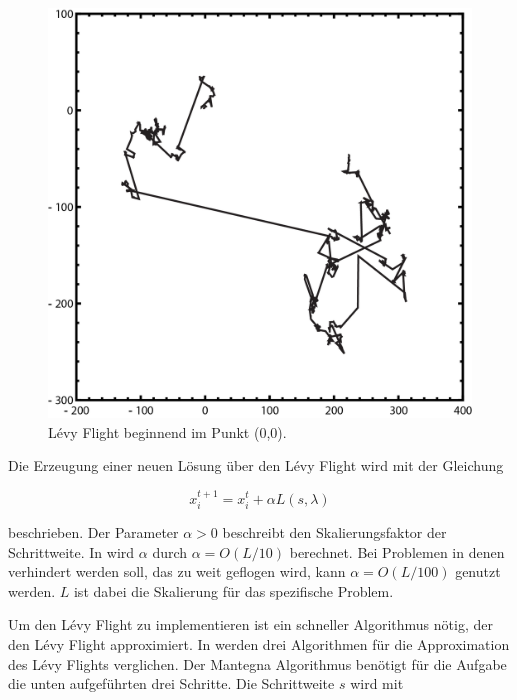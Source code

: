 \documentclass[conference]{IEEEtran}
\begin{document}
      \begin{figure}
        \centering
        \includegraphics[width=1\linewidth]{LevyFlight.png}
        \caption{Lévy Flight beginnend im Punkt (0,0).}
        \label{fig:levyFlight}
      \end{figure}


      Die Erzeugung einer neuen Lösung über den Lévy Flight wird mit der Gleichung

      \begin{equation}
      x_{i}^{t+1} = x_{i}^{t} + \alpha L(s, \lambda)\label{eq}
      \end{equation}

      beschrieben. Der Parameter $\alpha > 0$ beschreibt den Skalierungsfaktor der Schrittweite.  
      In \cite{b7} wird $\alpha$ durch $\alpha = O(L/10)$ berechnet. Bei Problemen in denen verhindert 
      werden soll, das zu weit geflogen wird, kann $\alpha = O(L/100)$ genutzt werden. $L$ ist dabei die 
      Skalierung für das spezifische Problem.

      Um den Lévy Flight zu implementieren ist ein schneller Algorithmus nötig, der den Lévy Flight approximiert. 
      In \cite{b8} werden drei Algorithmen für die Approximation des Lévy Flights verglichen. Der 
      Mantegna Algorithmus benötigt für die Aufgabe die unten aufgeführten drei Schritte. Die Schrittweite $s$ wird mit
      
\end{document}
